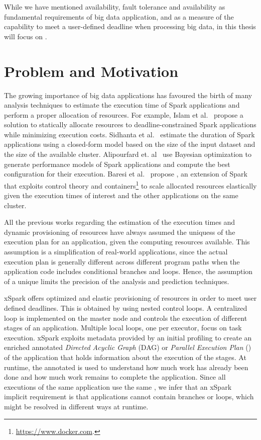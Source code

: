 While we have mentioned availability, fault tolerance and availability as fundamental requirements of big data application, and \qos as a measure of the capability to meet a user-defined deadline when processing big data, in this thesis will focus on \qos.

\section{Problem and Motivation}\label{sec:problem_motivation}
The growing importance of big data applications has favoured the birth of many analysis techniques to estimate the execution time of Spark applications and perform a proper allocation of resources. For example, Islam et al.~\cite{dSpark} propose a solution to statically allocate resources to deadline-constrained Spark applications while minimizing execution costs. Sidhanta et al.~\cite{Sidhanta2016} estimate the duration of Spark applications using a closed-form model based on the size of the input dataset and the size of the available cluster. Alipourfard et. al~\cite{Alipourfard} use Bayesian optimization to generate performance models of Spark applications and compute the best configuration for their execution.  Baresi et al.~\cite{xsparkreport, Quattrocchi2018} propose \cSpark, an extension of Spark that exploits control theory and containers\footnote{\url{https://www.docker.com}.} to scale allocated resources elastically given the execution times of interest and the other applications  on the same cluster.

All the previous works regarding the estimation of the execution times and dynamic provisioning of resources have always assumed the uniquess of the execution plan for an application, given the computing resources available. This assumption is a simplification of real-world applications, since the actual execution plan is generally different across different program paths when the application code includes conditional branches and loops. Hence, the assumption of a unique \plan limits the precision of the analysis and prediction techniques.

xSpark offers optimized and elastic provisioning of resources in order to meet user defined deadlines. This is obtained by using nested control loops. A centralized loop is implemented on the master node and controls the execution of different stages of an application. Multiple local loops, one per executor, focus on task execution. xSpark exploits metadata provided by an initial profiling to create an enriched annotated \textit{Directed Acyclic Graph} (DAG) or \textit{Parallel Execution Plan} (\plan) of the application that holds information about the execution of the stages. At runtime, the annotated \plan is used to understand how much work has already been done and how much work remains to complete the application. Since all executions of the same application use the same \plan, we infer that an xSpark implicit requirement is that applications cannot contain branches or loops, which might be resolved in different ways at runtime. 

